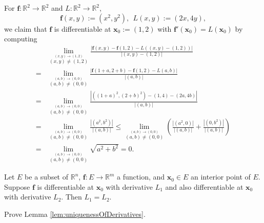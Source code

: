 \begin{exm}
  For $\mathbf{f}: \mathbb{R}^2\rightarrow \mathbb{R}^2$
  and $L: \mathbb{R}^2\rightarrow \mathbb{R}^2$,
  \begin{equation}
    \label{eq:fSqaureComp}
    \mathbf{f}(x,y):=(x^2, y^2), \ \ L(x,y):=(2x, 4y), 
  \end{equation}
  we claim that $\mathbf{f}$ is differentiable at $\mathbf{x}_{0}:=(1,2)$
  with \mbox{$\mathbf{f}'(\mathbf{x}_0)=L(\mathbf{x}_{0})$} by computing
  \begin{displaymath}
    \renewcommand{\arraystretch}{1.5}
    \begin{array}{rl}
    &\lim_{\stackrel{(x,y)\rightarrow (1,2)}{(x,y)\ne(1,2)}}
      \frac{|\mathbf{f}(x,y)- \mathbf{f}(1,2)
      - L((x,y)-(1,2))|}{|(x,y)-(1,2)|}
      \\
    =&\lim_{\stackrel{(a,b)\rightarrow (0,0)}{(a,b)\ne(0,0)}}
    \frac{|\mathbf{f}(1+a,2+b)- \mathbf{f}(1,2) - L(a,b)|}{|(a,b)|}
      \\
    =&\lim_{\stackrel{(a,b)\rightarrow (0,0)}{(a,b)\ne(0,0)}}
    \frac{|\left((1+a)^2,(2+b)^2\right)- (1,4) - (2a,4b)|}{|(a,b)|}
      \\
    =&\lim_{\stackrel{(a,b)\rightarrow (0,0)}{(a,b)\ne(0,0)}}
    \frac{|(a^2, b^2)|}{|(a,b)|}
    \le \lim_{\stackrel{(a,b)\rightarrow (0,0)}{(a,b)\ne(0,0)}}
          \left(\frac{|(a^2, 0)|}{|(a,b)|}
          +  \frac{|(0, b^2)|}{|(a,b)|}\right)
      \\
    = &\lim_{\stackrel{(a,b)\rightarrow (0,0)}{(a,b)\ne(0,0)}}
        \sqrt{a^2 + b^2}
    = 0.
    \end{array}
  \end{displaymath}
\end{exm}

\begin{lem}
  \label{lem:uniquenessOfDerivatives}
  Let $E$ be a subset of $\mathbb{R}^n$,
  $\mathbf{f}: E\rightarrow \mathbb{R}^m$ a function,
  and $\mathbf{x}_0\in E$ an interior point of $E$.
  Suppose $\mathbf{f}$ is differentiable at $\mathbf{x}_0$
  with derivative $L_1$
  and also differentiable at $\mathbf{x}_0$ with derivative $L_2$.
  Then $L_1=L_2$.
\end{lem}

\begin{exc}
  Prove Lemma \ref{lem:uniquenessOfDerivatives}.
\end{exc}

